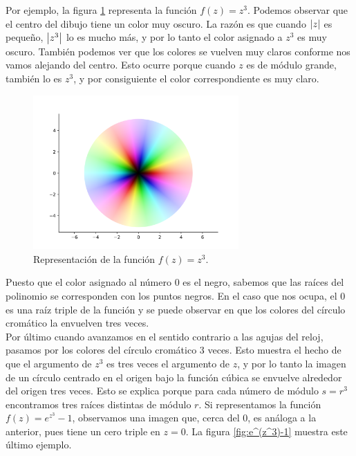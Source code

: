 Por ejemplo, la figura \ref{fig:z^3} representa la función $f(z) = z^3$. Podemos observar que el centro del dibujo tiene un color muy oscuro. La razón es que cuando $\left\lvert z\right\rvert$ es pequeño, $\left\lvert z^3\right\rvert$ lo es mucho más, y por lo tanto el color asignado a $z^3$ es muy oscuro. También podemos ver que los colores se vuelven muy claros conforme nos vamos alejando del centro. Esto ocurre porque cuando $z$ es de módulo grande, también lo es $z^3$, y por consiguiente el color correspondiente es muy claro. \\

\begin{figure}[!htbp]
    \centering
    \includegraphics[width=0.7\textwidth]{../Aplicacion/z^3.png}
    \caption{Representación de la función $f(z) = z^3$.}
    \label{fig:z^3}
\end{figure}

Puesto que el color asignado al número $0$ es el negro, sabemos que las raíces del polinomio se corresponden con los puntos negros. En el caso que nos ocupa, el $0$ es una raíz triple de la función y se puede observar en que los colores del círculo cromático la envuelven tres veces. \\

Por último cuando avanzamos en el sentido contrario a las agujas del reloj, pasamos por los colores del círculo cromático $3$ veces. Esto muestra el hecho de que el argumento de $z^3$ es tres veces el argumento de $z$, y por lo tanto la imagen de un círculo centrado en el origen bajo la función cúbica se envuelve alrededor del origen tres veces. Esto se explica porque para cada número de módulo $s=r^3$ encontramos tres raíces distintas de módulo $r$. Si representamos la función $f(z)=e^{z^3}-1$, observamos una imagen que, cerca del $0$, es análoga a la anterior, pues tiene un cero triple en $z=0$. La figura \ref{fig:e^(z^3)-1} muestra este último ejemplo. \\


